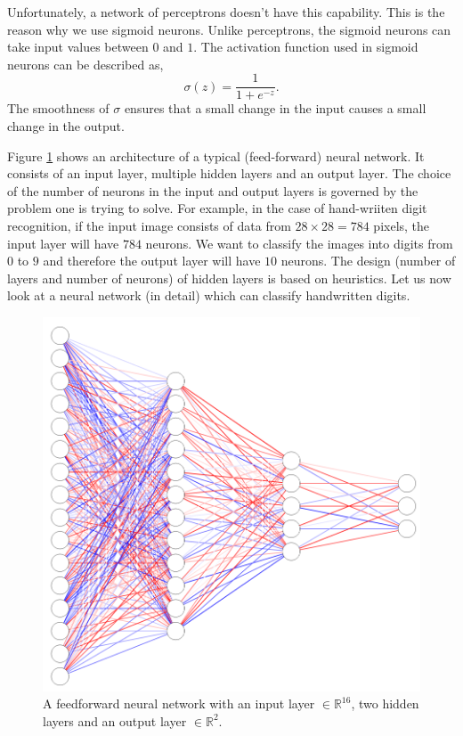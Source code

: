 Unfortunately, a network of perceptrons doesn't have this capability. This is the reason why we use sigmoid neurons. Unlike perceptrons, the sigmoid 
neurons can take input values between $0$ and $1$. The activation function used in sigmoid neurons can be described as, 
$$\sigma(z) = \frac{1}{1 + e^{-z}}.$$
The smoothness of $\sigma$ ensures that a small change in the input causes a small change in the output. 

Figure \ref{fig:deepNN} shows an architecture of a typical (feed-forward) neural network. It consists of an input layer, multiple hidden layers and an output layer. The choice of
the number of neurons in the input and output layers is governed by the problem one is trying to solve. For example, in the case of 
hand-wriiten digit recognition, if the input image consists of data from $28 \times 28 = 784$ pixels, the input layer will have $784$ neurons. We want to classify the 
images into digits from $0$ to $9$ and therefore the output layer will have $10$ neurons. The design (number of layers and number of neurons) of hidden layers
is based on heuristics. Let us now look at a neural network (in detail) which can classify handwritten digits. 
\begin{figure}[htbp]
    \centering
    \includegraphics[width=.4\textwidth]{Figures/DeepNN.png}
    \caption{A feedforward neural network with an input layer $\in \mathbb{R}^{16}$, two hidden layers and an output layer $\in \mathbb{R}^2$.}
    \label{fig:deepNN}
\end{figure}

